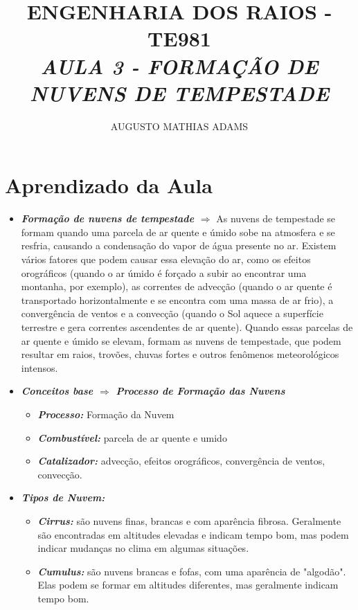 \documentclass[a4paper, 12pt, onecolumn,singlespacing]{article}
\title{\normalsize{ENGENHARIA DOS RAIOS - TE981}\\ \huge{\textbf\textit{{AULA 3 - FORMAÇÃO DE NUVENS DE TEMPESTADE}}\\}}
\author{\small{AUGUSTO MATHIAS ADAMS}}
\begin{document}
	
	\maketitle
	
	\section{Aprendizado da Aula}
	
	\begin{itemize}
		\item \textbf{\textit{Formação de nuvens de tempestade $\Rightarrow$ }} As nuvens de tempestade se formam quando uma parcela de ar quente e úmido sobe na atmosfera e se resfria, causando a condensação do vapor de água presente no ar. Existem vários fatores que podem causar essa elevação do ar, como os efeitos orográficos (quando o ar úmido é forçado a subir ao encontrar uma montanha, por exemplo), as correntes de advecção (quando o ar quente é transportado horizontalmente e se encontra com uma massa de ar frio), a convergência de ventos e a convecção (quando o Sol aquece a superfície terrestre e gera correntes ascendentes de ar quente). Quando essas parcelas de ar quente e úmido se elevam, formam as nuvens de tempestade, que podem resultar em raios, trovões, chuvas fortes e outros fenômenos meteorológicos intensos.
		\item \textbf{\textit{Conceitos base $\Rightarrow$ Processo de Formação das Nuvens}}
		\begin{itemize}
			\item \textbf{\textit{Processo: }}Formação da Nuvem
			\item \textbf{\textit{Combustível: }}parcela de ar quente e umido
			\item \textbf{\textit{Catalizador: }}advecção, efeitos orográficos, convergência de ventos, convecção.
		\end{itemize}
		\item \textbf{\textit{Tipos de Nuvem:}}
		\begin{itemize}
			\item  \textbf{\textit{Cirrus:}} são nuvens finas, brancas e com aparência fibrosa. Geralmente são encontradas em altitudes elevadas e indicam tempo bom, mas podem indicar mudanças no clima em algumas situações.
			
			\item \textbf{\textit{Cumulus:}} são nuvens brancas e fofas, com uma aparência de "algodão". Elas podem se formar em altitudes diferentes, mas geralmente indicam tempo bom.
			

\end{itemize}
\end{itemize}
\end{document}
